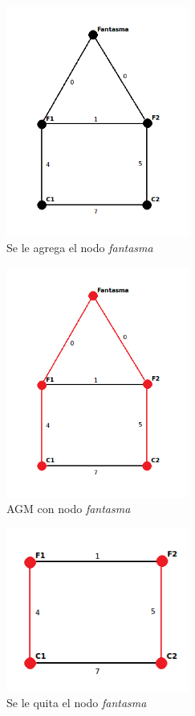 \documentclass[a4paper, 10pt, twoside]{article}
\begin{document}
\begin{figure}[ht!]
\centering
\includegraphics[width=60mm]{../ejemplo_graficos/CosoDosSubconjuntosConNodoFantasma.png}
\caption{Se le agrega el nodo \textit{fantasma}}
\label{2}
\end{figure} 

\begin{figure}[ht!]
\centering
\includegraphics[width=60mm]{../ejemplo_graficos/CosoDosSubconjuntosConNodoFantasmaSolucion.png}
\caption{AGM con nodo \textit{fantasma}}
\label{3}
\end{figure} 

\begin{figure}[ht!]
\centering
\includegraphics[width=60mm]{../ejemplo_graficos/CosoDosSubconjuntosSolucion.png}
\caption{Se le quita el nodo \textit{fantasma}}
\label{4}
\end{figure} 
\end{document}
